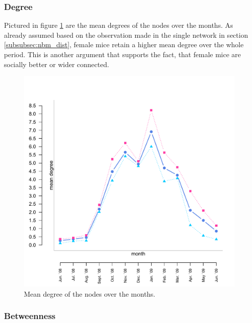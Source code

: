 % 

\subsubsection{Degree}

Pictured in figure \ref{fig:long_degree} are the mean degrees of the nodes over the months. As already assumed based on the observation made in the single network in section \ref{subsubsec:nbm_dist}, female mice retain a higher mean degree over the whole period. This is another argument that supports the fact, that female mice are socially better or wider connected.

\begin{figure}[htpb]
\begin{center}
  \includegraphics[width=.6\textwidth]{assets/pdf/long_degree.pdf}
  \caption[Mean degree of the nodes over the months]{Mean degree of the nodes over the months.}
  \label{fig:long_degree}
\end{center}
\end{figure} 


\subsubsection{Betweenness}
\label{subsubsec:long_betweenness}

